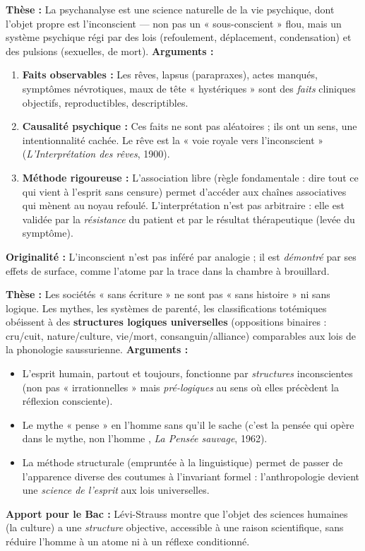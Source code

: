 \documentclass[11pt]{article}
\newcommand{\cle}[1]{{\popxbold\color{popdark}#1}}
\begin{document}
\begin{propriete}
\textbf{Thèse :} La psychanalyse est une science naturelle de la vie psychique, dont l'objet propre est l'\cle{inconscient} — non pas un « sous-conscient » flou, mais un système psychique régi par des lois (refoulement, déplacement, condensation) et des pulsions (sexuelles, de mort).
\textbf{Arguments :}
\begin{enumerate}
    \item \textbf{Faits observables :} Les rêves, lapsus (parapraxes), actes manqués, symptômes névrotiques, maux de tête « hystériques » sont des \emph{faits} cliniques objectifs, reproductibles, descriptibles.
    \item \textbf{Causalité psychique :} Ces faits ne sont pas aléatoires ; ils ont un sens, une intentionnalité cachée. Le rêve est la « voie royale vers l'inconscient » (\emph{L'Interprétation des rêves}, 1900).
    \item \textbf{Méthode rigoureuse :} L'association libre (règle fondamentale : dire tout ce qui vient à l'esprit sans censure) permet d'accéder aux chaînes associatives qui mènent au noyau refoulé. L'interprétation n'est pas arbitraire : elle est validée par la \emph{résistance} du patient et par le résultat thérapeutique (levée du symptôme).
\end{enumerate}
\textbf{Originalité :} L'inconscient n'est pas inféré par analogie ; il est \emph{démontré} par ses effets de surface, comme l'atome par la trace dans la chambre à brouillard.
\end{propriete}

\begin{propriete}
\textbf{Thèse :} Les sociétés « sans écriture » ne sont pas « sans histoire » ni sans logique. Les mythes, les systèmes de parenté, les classifications totémiques obéissent à des \textbf{structures logiques universelles} (oppositions binaires : cru/cuit, nature/culture, vie/mort, consanguin/alliance) comparables aux lois de la phonologie saussurienne.
\textbf{Arguments :}
\begin{itemize}
    \item L'esprit humain, partout et toujours, fonctionne par \emph{structures} inconscientes (non pas « irrationnelles » mais \emph{pré-logiques} au sens où elles précèdent la réflexion consciente).
    \item Le mythe « pense » en l'homme sans qu'il le sache (\guillemotleft c'est la pensée qui opère dans le mythe, non l'homme \guillemotright, \emph{La Pensée sauvage}, 1962).
    \item La méthode structurale (empruntée à la linguistique) permet de passer de l'apparence diverse des coutumes à l'invariant formel : l'anthropologie devient une \emph{science de l'esprit} aux lois universelles.
\end{itemize}
\textbf{Apport pour le Bac :} Lévi-Strauss montre que l'\cle{objet} des sciences humaines (la culture) a une \emph{structure} objective, accessible à une raison scientifique, sans réduire l'homme à un atome ni à un réflexe conditionné.
\end{propriete}
\end{document}
